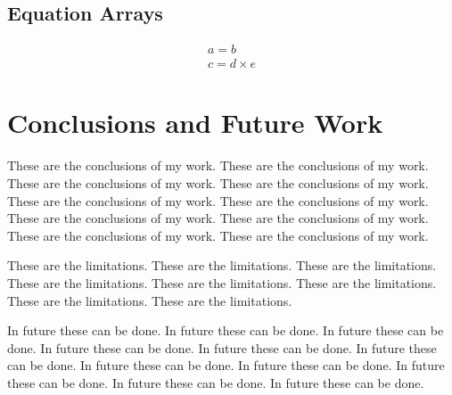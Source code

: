 \documentclass{report}
\begin{document}
\section{Equation Arrays}

\begin{eqnarray}
a = b \\
c = d \times e
\end{eqnarray}

\chapter {Conclusions and Future Work}

These are the conclusions of my work.
These are the conclusions of my work.
These are the conclusions of my work.
These are the conclusions of my work.
These are the conclusions of my work.
These are the conclusions of my work.
These are the conclusions of my work.
These are the conclusions of my work.
These are the conclusions of my work.
These are the conclusions of my work.

These are the limitations.
These are the limitations.
These are the limitations.
These are the limitations.
These are the limitations.
These are the limitations.
These are the limitations.
These are the limitations.

In future these can be done.
In future these can be done.
In future these can be done.
In future these can be done.
In future these can be done.
In future these can be done.
In future these can be done.
In future these can be done.
In future these can be done.
In future these can be done.
In future these can be done.



 

\end{document}
